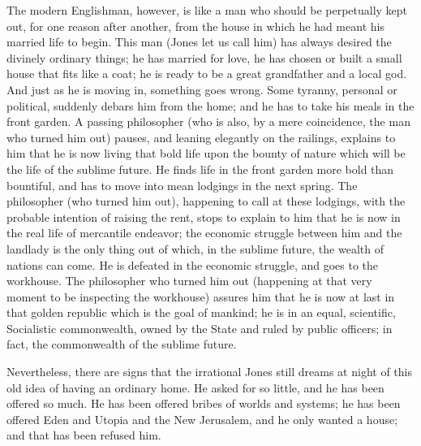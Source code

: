 \documentclass[final,10pt,letterpaper,twocolumn,openany]{book}
\begin{document}
The modern Englishman, however, is like a man who should be
perpetually kept out, for one reason after another, from the house in which
he had meant his married life to begin. This man (Jones let us call him)
has always desired the divinely ordinary things; he has married for love,
he has chosen or built a small house that fits like a coat; he is ready to be a
great grandfather and a local god. And just as he is moving in, something
goes wrong. Some tyranny, personal or political, suddenly debars him
from the home; and he has to take his meals in the front garden. A passing
philosopher (who is also, by a mere coincidence, the man who turned him
out) pauses, and leaning elegantly on the railings, explains to him that he
is now living that bold life upon the bounty of nature which will be the life
of the sublime future. He finds life in the front garden more bold than
bountiful, and has to move into mean lodgings in the next spring. The
philosopher (who turned him out), happening to call at these lodgings,
with the probable intention of raising the rent, stops to explain to him that
he is now in the real life of mercantile endeavor; the economic struggle
between him and the landlady is the only thing out of which, in the
sublime future, the wealth of nations can come. He is defeated in the
economic struggle, and goes to the workhouse. The philosopher who
turned him out (happening at that very moment to be inspecting the
workhouse) assures him that he is now at last in that golden republic
which is the goal of mankind; he is in an equal, scientific, Socialistic
commonwealth, owned by the State and ruled by public officers; in fact,
the commonwealth of the sublime future.

Nevertheless, there are signs that the irrational Jones still dreams at
night of this old idea of having an ordinary home. He asked for so little,
and he has been offered so much. He has been offered bribes of worlds
and systems; he has been offered Eden and Utopia and the New Jerusalem,
and he only wanted a house; and that has been refused him.
\end{document}
